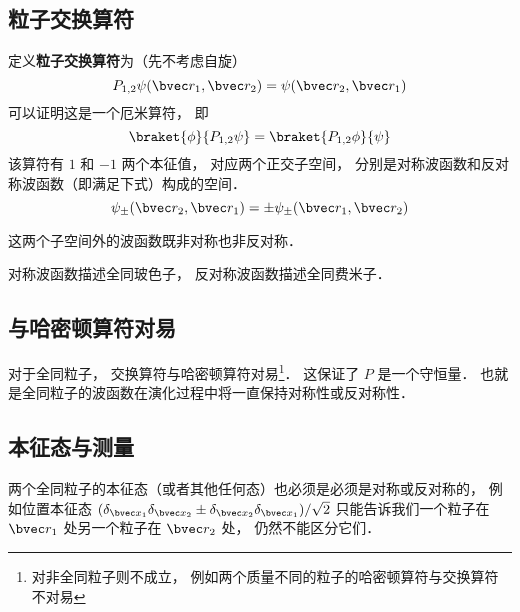 

\subsection{粒子交换算符}

定义\textbf{粒子交换算符}为（先不考虑自旋）
\begin{equation}
P_{1,2}\psi(\bvec r_1, \bvec r_2) = \psi(\bvec r_2, \bvec r_1)
\end{equation}
可以证明这是一个厄米算符， 即
\begin{equation}
\braket{\phi}{P_{1,2}\psi} = \braket{P_{1,2}\phi}{\psi}
\end{equation}
该算符有 $1$ 和 $-1$ 两个本征值， 对应两个正交子空间， 分别是对称波函数和反对称波函数（即满足下式）构成的空间．
\begin{equation}
\psi_\pm(\bvec r_2, \bvec r_1) = \pm\psi_\pm(\bvec r_1, \bvec r_2)
\end{equation}

这两个子空间外的波函数既非对称也非反对称．

对称波函数描述全同玻色子， 反对称波函数描述全同费米子．

\subsection{与哈密顿算符对易}

对于全同粒子， 交换算符与哈密顿算符对易\footnote{对非全同粒子则不成立， 例如两个质量不同的粒子的哈密顿算符与交换算符不对易}． 这保证了 $P$ 是一个守恒量． 也就是全同粒子的波函数在演化过程中将一直保持对称性或反对称性．

\subsection{本征态与测量}
两个全同粒子的本征态（或者其他任何态）也必须是必须是对称或反对称的， 例如位置本征态 $(\delta_{\bvec x_1} \delta_{\bvec x_2}\pm \delta_{\bvec x_2} \delta_{\bvec x_1})/\sqrt 2$ 只能告诉我们一个粒子在 $\bvec r_1$ 处另一个粒子在 $\bvec r_2$ 处， 仍然不能区分它们．

